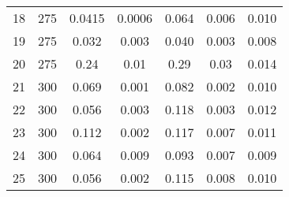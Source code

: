 \begin{table}
\begin{tabular}{S[table-format=2.0] S[table-format=3.0] S[table-format=1.6] S[table-format=1.6] S[table-format=1.4] S[table-format=1.4]S[table-format=1.3]}
18  & 275   &   0.0415    & 0.0006     & 0.064     & 0.006     & 0.010   \\
19  & 275   &   0.032     & 0.003      & 0.040     & 0.003     & 0.008   \\
20  & 275   &   0.24      & 0.01       & 0.29      & 0.03      & 0.014   \\
21  & 300   &   0.069     & 0.001      & 0.082     & 0.002     & 0.010   \\
22  & 300   &   0.056     & 0.003      & 0.118     & 0.003     & 0.012   \\
23  & 300   &   0.112     & 0.002      & 0.117     & 0.007     & 0.011   \\
24  & 300   &   0.064     & 0.009      & 0.093     & 0.007     & 0.009   \\
25  & 300   &   0.056     & 0.002      & 0.115     & 0.008     & 0.010   \\
		\bottomrule
	\end{tabular}
	\caption{} 
	\label{tab:werte}
\end{table}
